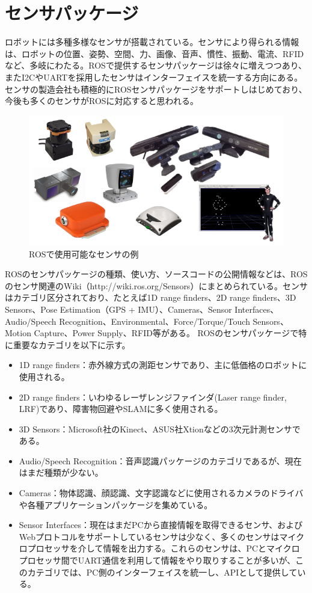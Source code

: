 \section{センサパッケージ}

ロボットには多種多様なセンサが搭載されている。センサにより得られる情報は、ロボットの位置、姿勢、空間、力、画像、音声、慣性、振動、電流、RFIDなど、多岐にわたる。ROSで提供するセンサパッケージは徐々に増えつつあり、またI2CやUARTを採用したセンサはインターフェイスを統一する方向にある。センサの製造会社も積極的にROSセンサパッケージをサポートしはじめており、今後も多くのセンサがROSに対応すると思われる。

\begin{figure}[htp]
  \centering
  \includegraphics[width=15cm]{pictures/chapter7/pic_07_03.png}
  \caption{ROSで使用可能なセンサの例}
\end{figure}

ROSのセンサパッケージの種類、使い方、ソースコードの公開情報などは、ROSのセンサ関連のWiki（http://wiki.ros.org/Sensors）にまとめられている。センサはカテゴリ区分されており、たとえば1D range finders、2D range finders、3D Sensors、Pose Estimation（GPS + IMU）、Cameras、Sensor Interfaces、Audio/Speech Recognition、Environmental、Force/Torque/Touch Sensors、Motion Capture、Power Supply、RFID等がある。
 ROSのセンサパッケージで特に重要なカテゴリを以下に示す。

\begin{itemize}
\item 1D range finders：赤外線方式の測距センサであり、主に低価格のロボットに使用される。
\item 2D range finders：いわゆるレーザレンジファインダ(Laser range finder, LRF)であり、障害物回避やSLAMに多く使用される。
\item 3D Sensors：Microsoft社のKinect、ASUS社Xtionなどの3次元計測センサである。
\item Audio/Speech Recognition：音声認識パッケージのカテゴリであるが、現在はまだ種類が少ない。
\item Cameras：物体認識、顔認識、文字認識などに使用されるカメラのドライバや各種アプリケーションパッケージを集めている。
\item Sensor Interfaces：現在はまだPCから直接情報を取得できるセンサ、およびWebプロトコルをサポートしているセンサは少なく、多くのセンサはマイクロプロセッサを介して情報を出力する。これらのセンサは、PCとマイクロプロセッサ間でUART通信を利用して情報をやり取りすることが多いが、このカテゴリでは、PC側のインターフェイスを統一し、APIとして提供している。
\end{itemize}

